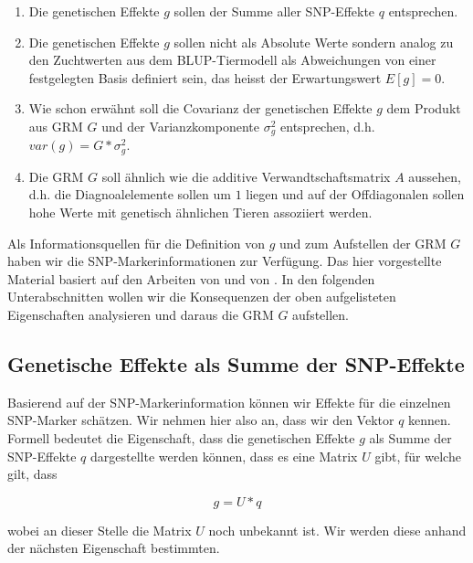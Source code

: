 \documentclass[]{book}
\providecommand{\tightlist}{%
  \setlength{\itemsep}{0pt}\setlength{\parskip}{0pt}}
\begin{document}
\begin{enumerate}
\def\labelenumi{\arabic{enumi}.}
\tightlist
\item
  Die genetischen Effekte \(g\) sollen der Summe aller SNP-Effekte \(q\)
  entsprechen.
\item
  Die genetischen Effekte \(g\) sollen nicht als Absolute Werte sondern
  analog zu den Zuchtwerten aus dem BLUP-Tiermodell als Abweichungen von
  einer festgelegten Basis definiert sein, das heisst der Erwartungswert
  \(E\left[g\right] = 0\).
\item
  Wie schon erwähnt soll die Covarianz der genetischen Effekte \(g\) dem
  Produkt aus GRM \(G\) und der Varianzkomponente \(\sigma_g^2\)
  entsprechen, d.h. \(var(g) = G * \sigma_g^2\).
\item
  Die GRM \(G\) soll ähnlich wie die additive Verwandtschaftsmatrix
  \(A\) aussehen, d.h. die Diagnoalelemente sollen um \(1\) liegen und
  auf der Offdiagonalen sollen hohe Werte mit genetisch ähnlichen Tieren
  assoziiert werden.
\end{enumerate}

Als Informationsquellen für die Definition von \(g\) und zum Aufstellen
der GRM \(G\) haben wir die SNP-Markerinformationen zur Verfügung. Das
hier vorgestellte Material basiert auf den Arbeiten von
\citep{VanRaden2008} und von \citep{GDHMF2009}. In den folgenden
Unterabschnitten wollen wir die Konsequenzen der oben aufgelisteten
Eigenschaften analysieren und daraus die GRM \(G\) aufstellen.

\subsection{Genetische Effekte als Summe der
SNP-Effekte}\label{genetische-effekte-als-summe-der-snp-effekte}

Basierend auf der SNP-Markerinformation können wir Effekte für die
einzelnen SNP-Marker schätzen. Wir nehmen hier also an, dass wir den
Vektor \(q\) kennen. Formell bedeutet die Eigenschaft, dass die
genetischen Effekte \(g\) als Summe der SNP-Effekte \(q\) dargestellte
werden können, dass es eine Matrix \(U\) gibt, für welche gilt, dass

\begin{equation}
g = U * q
\label{eq:VecGSumOfVecQ}
\end{equation}

wobei an dieser Stelle die Matrix \(U\) noch unbekannt ist. Wir werden
diese anhand der nächsten Eigenschaft bestimmten.
\end{document}
